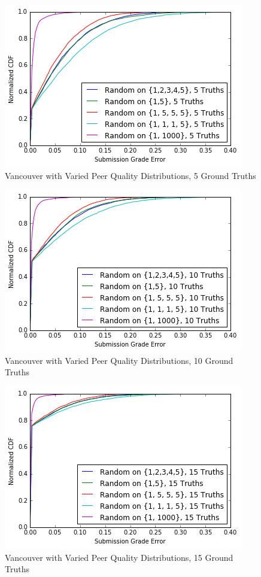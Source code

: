 \documentclass{article}
\begin{document}
	\begin{figure}[h]
		\includegraphics{vancouver-distribs-5.png}
		\caption{Vancouver with Varied Peer Quality Distributions, 5 Ground Truths}
		\label{fig:vancouver-distribs-5}
	\end{figure}
	
	\begin{figure}[h]
		\includegraphics{vancouver-distribs-10.png}
		\caption{Vancouver with Varied Peer Quality Distributions, 10 Ground Truths}
		\label{fig:vancouver-distribs-10}
	\end{figure}
	
	\begin{figure}[h]
		\includegraphics{vancouver-distribs-15.png}
		\caption{Vancouver with Varied Peer Quality Distributions, 15 Ground Truths}
		\label{fig:vancouver-distribs-15}
	\end{figure}
	
\end{document}
